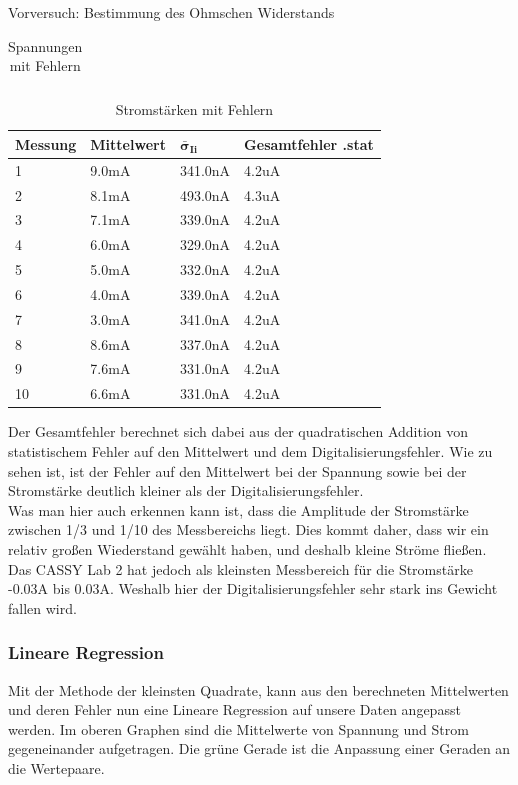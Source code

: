 \documentclass[twoside]{protokoll}
\begin{document}
\begin{aufgabe}{Vorversuch: Bestimmung des Ohmschen Widerstands}
\begin{table}[H]
\begin{tabularx}{1\textwidth}{X X X X}
        \bottomrule
    \end{tabularx}
    \caption{Spannungen mit Fehlern}
    \label{tab:Tabelle 3}
\end{table}
\begin{table}[H]
    \centering
    \begin{tabularx}{1\textwidth}{X X X X}
        \toprule
        \textbf{Messung} & \textbf{Mittelwert} & $\pmb{\bar{\sigma}_{Ii}}$ & \textbf{Gesamtfehler .stat} \\
        \midrule
        1 & 9.0mA & 341.0nA & 4.2uA \\
        2 & 8.1mA & 493.0nA & 4.3uA \\
        3 & 7.1mA & 339.0nA & 4.2uA \\
        4 & 6.0mA & 329.0nA & 4.2uA \\
        5 & 5.0mA & 332.0nA & 4.2uA \\
        6 & 4.0mA & 339.0nA & 4.2uA \\
        7 & 3.0mA & 341.0nA & 4.2uA \\
        8 & 8.6mA & 337.0nA & 4.2uA \\
        9 & 7.6mA & 331.0nA & 4.2uA \\
        10 & 6.6mA & 331.0nA & 4.2uA \\
        \bottomrule
    \end{tabularx}
    \caption{Stromstärken mit Fehlern}
    \label{tab:Tabelle 4}
\end{table}
Der Gesamtfehler berechnet sich dabei aus der quadratischen Addition von statistischem Fehler auf den Mittelwert und dem Digitalisierungsfehler.
Wie zu sehen ist, ist der Fehler auf den Mittelwert bei der Spannung sowie bei der Stromstärke deutlich kleiner als der Digitalisierungsfehler.\\

Was man hier auch erkennen kann ist, dass die Amplitude der Stromstärke zwischen 1/3 und 1/10 des Messbereichs liegt.
Dies kommt daher, dass wir ein relativ großen Wiederstand gewählt haben, und deshalb kleine Ströme fließen. 
Das CASSY Lab 2 hat jedoch als kleinsten Messbereich für die Stromstärke -0.03A bis 0.03A. 
Weshalb hier der Digitalisierungsfehler sehr stark ins Gewicht fallen wird. 

\subsubsection{Lineare Regression}

Mit der Methode der kleinsten Quadrate, kann aus den berechneten Mittelwerten und deren Fehler nun eine Lineare Regression auf unsere Daten angepasst werden.
Im oberen Graphen sind die Mittelwerte von Spannung und Strom gegeneinander aufgetragen.
Die grüne Gerade ist die Anpassung einer Geraden an die Wertepaare.
 

\end{aufgabe}
\end{document}
